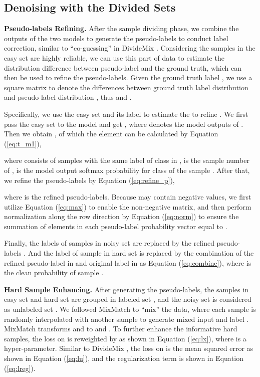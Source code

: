 \documentclass[letterpaper]{article} \usepackage{aaai22}  \usepackage{times}  \usepackage{helvet}  \usepackage{courier}  \usepackage[hyphens]{url}  \usepackage{graphicx} \urlstyle{rm} \def\UrlFont{\rm}  \usepackage{natbib}  \usepackage{caption} \DeclareCaptionStyle{ruled}{labelfont=normalfont,labelsep=colon,strut=off} \frenchspacing  \setlength{\pdfpagewidth}{8.5in}  \setlength{\pdfpageheight}{11in}  \usepackage{algorithm}
\begin{document}
\subsection{Denoising with the Divided Sets}
\label{PGD}
\textbf{Pseudo-labels Refining.} After the sample dividing phase, we combine the outputs of the two models to generate the pseudo-labels  to conduct label correction, similar to ``co-guessing” in DivideMix \cite{2020DivideMix}. Considering the samples in the easy set are highly reliable, we can use this part of data to estimate the distribution difference between pseudo-label and the ground truth, which can then be used to refine the pseudo-labels. Given the ground truth label , we use a square matrix  to denote the differences between ground truth label distribution  and pseudo-label distribution , thus  and . 

Specifically, we use the easy set  and its label  to estimate the  to refine . We first pass the easy set  to the model and get , where  denotes the model outputs of . 
Then we obtain , of which the element  can be calculated by Equation (\ref{eq:t_m1}),

where  consists of samples with the same label of class  in ,  is the sample number of ,  is the model output softmax probability for class  of the sample . After that, we refine the pseudo-labels  by Equation (\ref{eq:refine_p}), 

where  is the refined pseudo-labels. Because  may contain negative values, we first utilize Equation (\ref{eq:max}) to enable the non-negative matrix, and then perform normalization along the row direction by Equation (\ref{eq:norm}) to ensure the summation of elements in each pseudo-label probability vector equal to .





Finally, the labels of samples in noisy set  are replaced by the refined pseudo-labels . And the label of sample  in hard set  is replaced by the combination of the refined pseudo-label  in  and original label  in  as Equation (\ref{eq:combine}), where  is the clean probability of sample .






\textbf{Hard Sample Enhancing.} After generating the pseudo-labels, the samples in easy set and hard set are grouped in labeled set , and the noisy set is considered as unlabeled set . We followed MixMatch \cite{2019MixMatch} to ``mix'' the data, where each sample is randomly interpolated with another sample to generate mixed input  and label . MixMatch transforms  and  to  and . To further enhance the informative hard samples, the loss on  is reweighted by  as shown in Equation (\ref{eq:lx}), where  is a hyper-parameter. Similar to DivideMix \cite{2020DivideMix}, the loss on  is the mean squared error as shown in Equation (\ref{eq:lu}), and the regularization term is shown in Equation (\ref{eq:lreg}).
\end{document}
